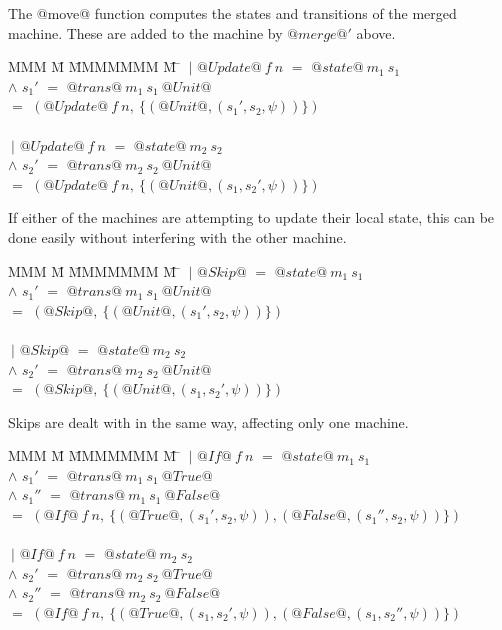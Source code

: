 The @move@ function computes the states and transitions of the merged machine.
These are added to the machine by $@merge@'$ above.

\begin{tabbing}
MMM \= M \= MMMMMMM \= M \=\kill
 \> $~|$ \> $@Update@~f~n$ \> $=$ \> $@state@~m_1~s_1$ \\
 \> $\wedge$ \> $s_1'$     \> $=$ \> $@trans@~m_1~s_1~@Unit@$ \\
 \> $=$ \> $(@Update@~f~n,~\{(@Unit@, (s_1',s_2,\psi))\})$ \\
\\
 \> $~|$ \> $@Update@~f~n$ \> $=$ \> $@state@~m_2~s_2$ \\
 \> $\wedge$ \> $s_2'$     \> $=$ \> $@trans@~m_2~s_2~@Unit@$ \\
 \> $=$ \> $(@Update@~f~n,~\{(@Unit@, (s_1,s_2',\psi))\})$ \\
\end{tabbing}

If either of the machines are attempting to update their local state, this can be done easily without interfering with the other machine.

\begin{tabbing}
MMM \= M \= MMMMMMM \= M \=\kill
 \> $~|$ \> $@Skip@$ \> $=$ \> $@state@~m_1~s_1$ \\
 \> $\wedge$ \> $s_1'$     \> $=$ \> $@trans@~m_1~s_1~@Unit@$ \\
 \> $=$ \> $(@Skip@,~\{(@Unit@, (s_1',s_2,\psi))\})$ \\
\\
 \> $~|$ \> $@Skip@$ \> $=$ \> $@state@~m_2~s_2$ \\
 \> $\wedge$ \> $s_2'$     \> $=$ \> $@trans@~m_2~s_2~@Unit@$ \\
 \> $=$ \> $(@Skip@,~\{(@Unit@, (s_1,s_2',\psi))\})$ \\
\end{tabbing}

Skips are dealt with in the same way, affecting only one machine.

\begin{tabbing}
MMM \= M \= MMMMMMM \= M \=\kill
 \> $~|$ \> $@If@~f~n$ \> $=$ \> $@state@~m_1~s_1$ \\
 \> $\wedge$ \> $s_1'$     \> $=$ \> $@trans@~m_1~s_1~@True@$ \\
 \> $\wedge$ \> $s_1''$     \> $=$ \> $@trans@~m_1~s_1~@False@$ \\
 \> $=$ \> $(@If@~f~n,~\{(@True@, (s_1',s_2,\psi)), (@False@, (s_1'', s_2, \psi))\})$ \\
\\
 \> $~|$ \> $@If@~f~n$ \> $=$ \> $@state@~m_2~s_2$ \\
 \> $\wedge$ \> $s_2'$     \> $=$ \> $@trans@~m_2~s_2~@True@$ \\
 \> $\wedge$ \> $s_2''$     \> $=$ \> $@trans@~m_2~s_2~@False@$ \\
 \> $=$ \> $(@If@~f~n,~\{(@True@, (s_1,s_2',\psi)), (@False@, (s_1, s_2'', \psi))\})$ \\
\end{tabbing}

